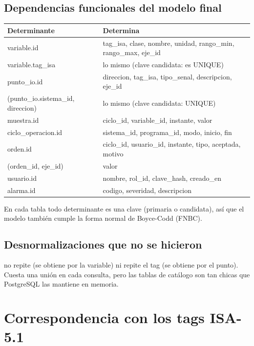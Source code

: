\documentclass[a4paper,11pt]{article}
\begin{document}
\subsection{Dependencias funcionales del modelo final}
\begin{center}\small
\begin{tabularx}{\linewidth}{>{\ttfamily\raggedright}p{4.6cm} >{\raggedright\arraybackslash}X}
\toprule
\textrm{\textbf{Determinante}} & \textbf{Determina}\\
\midrule
variable.id & tag\_isa, clase, nombre, unidad, rango\_min, rango\_max, eje\_id\\
variable.tag\_isa & lo mismo (clave candidata: es UNIQUE)\\
punto\_io.id & direccion, tag\_isa, tipo\_senal, descripcion, eje\_id\\
(punto\_io.sistema\_id, direccion) & lo mismo (clave candidata: UNIQUE)\\
muestra.id & ciclo\_id, variable\_id, instante, valor\\
ciclo\_operacion.id & sistema\_id, programa\_id, modo, inicio, fin\\
orden.id & ciclo\_id, usuario\_id, instante, tipo, aceptada, motivo\\
(orden\_id, eje\_id) & valor\\
usuario.id & nombre, rol\_id, clave\_hash, creado\_en\\
alarma.id & codigo, severidad, descripcion\\
\bottomrule
\end{tabularx}
\end{center}
En cada tabla todo determinante es una clave (primaria o candidata), así que el modelo también cumple la forma normal de Boyce-Codd (FNBC).

\subsection{Desnormalizaciones que no se hicieron}
 no repite  (se obtiene por la variable) ni  repite el tag (se obtiene por el punto). Cuesta una unión en cada consulta, pero las tablas de catálogo son tan chicas que PostgreSQL las mantiene en memoria.

\section{Correspondencia con los tags ISA-5.1}\label{sec:tags}
\end{document}
